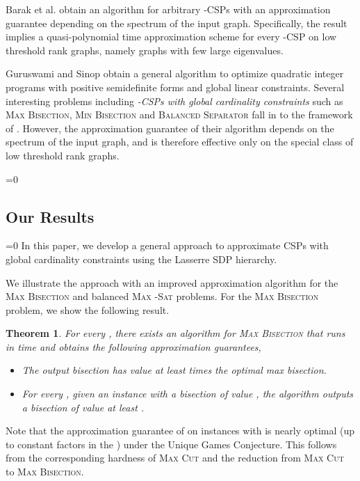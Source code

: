 \documentclass[11pt]{article}
\def\full{1}
\newtheorem{theorem}{Theorem}[section]
\theoremstyle{definition}
\newcommand{\etal}{et al.\xspace}
\newcommand{\problemmacro}[1]{\texorpdfstring{\textsc{#1}}{#1}\xspace}
\newcommand{\maxcut}{\problemmacro{Max Cut}}
\newcommand{\balancedseparator}{\problemmacro{Balanced Separator}}
\newcommand{\maxtwosat}{\problemmacro{Max -Sat}}
\newcommand{\minbisection}{\problemmacro{Min Bisection}}
\newcommand{\maxbisection}{\problemmacro{Max Bisection}}
\numberwithin{equation}{section}
\begin{document}
Barak \etal \cite{BarakRS11} obtain an algorithm for arbitrary
-CSPs with an approximation guarantee depending on the spectrum of the
input graph.  Specifically, the result implies a quasi-polynomial time approximation scheme for every -CSP on
low threshold rank graphs, namely graphs with few large eigenvalues.

Guruswami and Sinop \cite{GuruswamiS11} obtain a general algorithm to
optimize quadratic integer programs with positive semidefinite forms
and global linear constraints.  Several interesting
problems including {\it -CSPs with  global cardinality constraints} such
as \maxbisection, \minbisection and \balancedseparator fall in to
the framework of \cite{GuruswamiS11}.  However, the approximation
guarantee of their algorithm depends on the spectrum of the input
graph, and is therefore effective only on the special class of
low threshold rank graphs.

\ifnum\full=0 \vspace{-8pt}\fi
\subsection{Our Results}
\ifnum\full=0 \vspace{-8pt}\fi
In this paper, we develop a general approach to approximate CSPs with
global cardinality constraints using the Lasserre SDP hierarchy.

We illustrate the approach with an improved approximation algorithm
for the \maxbisection and balanced \maxtwosat problems.  For the
\maxbisection problem, we show the following result.

\begin{theorem} \label{thm:max-bisection}
For every , there exists an algorithm for \maxbisection
that runs in time  and obtains the following
approximation guarantees,
\begin{itemize}
	\item The output bisection has value at least  times the
		optimal max bisection.
	\item For every , given an instance  with a
		bisection of value , the algorithm
		outputs a bisection of value at least .
\end{itemize}
\end{theorem}

Note that the approximation guarantee of  on
instances with  is nearly optimal (up to constant factors
in the )
under the Unique Games Conjecture.  This follows from the
corresponding hardness of \maxcut and the reduction from \maxcut to
\maxbisection.
\end{document}
